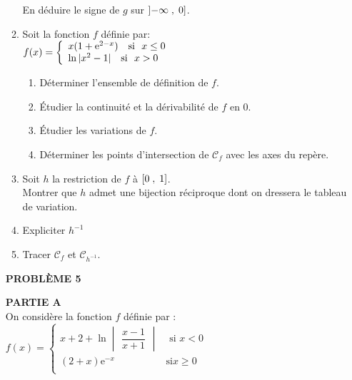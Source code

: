 \begin{enumerate}
\begin{enumerate}
En  déduire le signe de $ g $  sur $ \left]-\infty \;, \;0\right] $.

\item  Soit la fonction $ f $ définie par: \\ 

  $f(x)=\left \{\begin{array}{l} x(1+\mathrm{e}^{2-x})~~~ \textrm{si}~~ x  \leq 0 \\ 
   \ln|x^{2}-1|~~~ \textrm{si}~~ x > 0 \end{array}\right.$


\begin{enumerate}

\item Déterminer l'ensemble de définition de $ f $.
\item Étudier la continuité et  la dérivabilité de $ f $  en $ 0 $.
\item Étudier les variations de $ f $. 
\item Déterminer les points d'intersection de $\mathscr{C}_{f}$  avec les axes du repère.
\end{enumerate}
\item Soit $ h $  la restriction de $ f $ à $ \left[0\;,\; 1\right] $.\\ Montrer que $ h $  admet une bijection  réciproque dont on dressera le tableau de variation.

\item Expliciter $ h^{-1} $
\item Tracer $\mathscr{C}_{f}$  et $\mathscr{C}_{h^{-1}}$.
\end{enumerate}

\vspace{0,5cm}

\textbf{PROBLÈME 5}

\vspace{0,2cm}

 \textbf{ PARTIE A}\\ 
   On considère  la fonction $ f $ définie par :\\ $f(x)=\begin{cases}  
x+2 +\ln\begin{vmatrix}\dfrac{x-1}{x+1}\end{vmatrix} & \text{ si } x < 0 \\

(2+x)\text{e}^{-x}  & \text{si}  x\geq 0 \\ 
\end{cases} $ \medskip


\end{enumerate}
